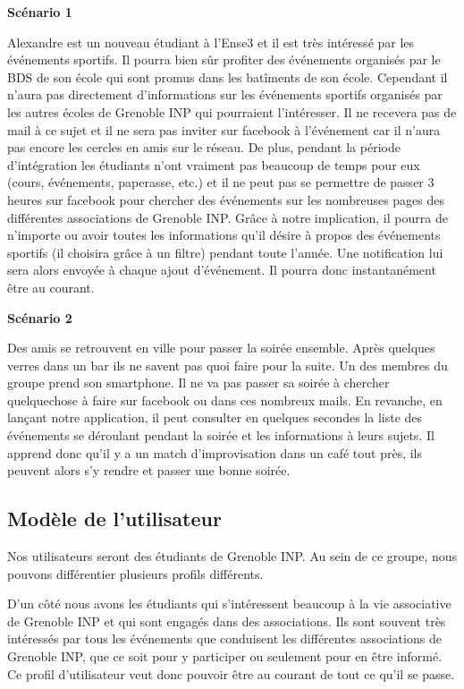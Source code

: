 \documentclass[a4paper, 11px]{article}
\begin{document}
{\bf Scénario 1} 

Alexandre est un nouveau étudiant à l'Ense3 et il est très intéressé par les événements sportifs. Il pourra bien sûr profiter des événements organisés par
le BDS de son école qui sont promus dans les batîments de son école. Cependant il n'aura pas directement d'informations sur les événements sportifs 
organisés par les autres écoles de Grenoble INP qui pourraient l'intéresser. Il ne recevera pas de mail à ce sujet et il ne sera pas inviter sur facebook
à l'événement car il n'aura pas encore les cercles en amis sur le réseau. De plus, pendant la période d'intégration les étudiants n'ont vraiment pas beaucoup
de temps pour eux (cours, événements, paperasse, etc.) et il ne peut pas se permettre de passer 3 heures sur facebook pour chercher des événements
sur les nombreuses pages des différentes associations de Grenoble INP. Grâce à notre implication, il pourra de n'importe ou avoir toutes les informations qu'il désire
à propos des événements sportifs (il choisira grâce à un filtre) pendant toute l'année. Une notification lui sera alors envoyée à chaque ajout d'événement. Il pourra donc
instantanément être au courant.

{\bf Scénario 2}

Des amis se retrouvent en ville pour passer la soirée ensemble. Après quelques verres dans un bar ils ne savent pas quoi faire pour la suite. Un des membres du groupe
prend son smartphone. Il ne va pas passer sa soirée à chercher quelquechose à faire sur facebook ou dans ces nombreux mails. En revanche, en lançant notre application,
il peut consulter en quelques secondes la liste des événements se déroulant pendant la soirée et les informations à leurs sujets. Il apprend donc qu'il y a un match d'improvisation
dans un café tout près, ils peuvent alors s'y rendre et passer une bonne soirée.

\subsection{Modèle de l'utilisateur}

Nos utilisateurs seront des étudiants de Grenoble INP. Au sein de ce groupe, nous pouvons différentier plusieurs profils différents.

D'un côté nous avons les étudiants qui s'intéressent beaucoup à la vie associative de Grenoble INP et qui sont engagés dans des associations.
Ils sont souvent très intéressés par tous les événements que conduisent les différentes associations de Grenoble INP, que ce soit pour y participer ou seulement
pour en être informé. Ce profil d'utilisateur veut donc pouvoir être au courant de tout ce qu'il se passe.
\end{document}
